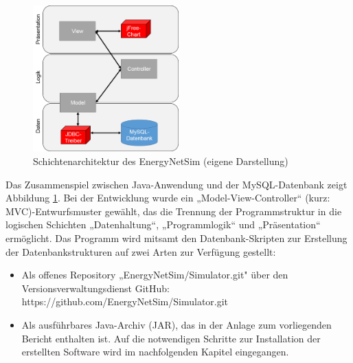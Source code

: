 \documentclass[12pt,titlepage]{article}
\begin{document}
\begin{figure}[!ht]
	\centering
	\includegraphics[width=0.5\textwidth]{ErgSoftwareMVC}
	\caption{Schichtenarchitektur des EnergyNetSim (eigene Darstellung)}
	\label{fig:ErgSoftwareMVC}
\end{figure}
Das Zusammenspiel zwischen Java-Anwendung und der MySQL-Datenbank zeigt
Abbildung \ref{fig:ErgSoftwareMVC}. Bei der Entwicklung wurde ein „Model-View-Controller“ (kurz: MVC)-Entwurfsmuster gewählt, das die Trennung der Programmstruktur in die logischen Schichten „Datenhaltung“, „Programmlogik“ und „Präsentation“ ermöglicht.
Das Programm wird mitsamt den Datenbank-Skripten zur Erstellung der Datenbankstrukturen auf zwei Arten zur Verfügung gestellt:
\begin{itemize}
\item Als offenes Repository „EnergyNetSim/Simulator.git" über den Versionsverwaltungsdienst GitHub: https://github.com/EnergyNetSim/Simulator.git
\item Als ausführbares Java-Archiv (JAR), das in der Anlage zum vorliegenden Bericht enthalten ist.
Auf die notwendigen Schritte zur Installation der erstellten Software wird im nachfolgenden Kapitel eingegangen.
\end{itemize}
\end{document}
